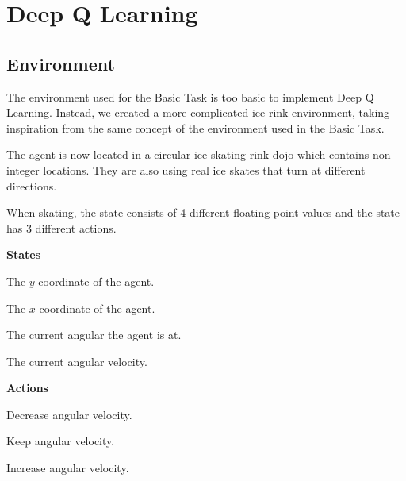 \renewcommand{\thesection}{Advanced Task}
\section{Deep Q Learning}
\subsection{Environment}
The environment used for the Basic Task is too basic to implement Deep Q Learning. Instead, we created a more complicated ice rink environment, taking inspiration from the  same concept of the environment used in the Basic Task.

The agent is now located in a circular ice skating rink dojo which contains non-integer locations.
They are also using real ice skates that turn at different directions.

When skating, the state consists of 4 different floating point values and the state has 3 different actions.

\begin{center}
	\begin{minipage}[t]{.48\textwidth}
		\begin{center}
			\textbf{States}
		\end{center}
		\begin{description}[noitemsep,style=nextline]
			\item[\bm{$y$}] The $y$ coordinate of the agent.
			\item[\bm{$x$}] The $x$ coordinate of the agent.
			\item[\bm{$\varphi$}] The current angular the agent is at.
			\item[\bm{$\theta$}] The current angular velocity.
		\end{description}
	\end{minipage}
	\begin{minipage}[t]{.48\textwidth}
		\begin{center}
			\textbf{Actions}
		\end{center}
		\begin{description}[noitemsep]
			\item[0. Turn Left] Decrease angular velocity.
			\item[1. Stay Put] Keep angular velocity.
			\item[2. Turn Right] Increase angular velocity.
		\end{description}
	\end{minipage}
\end{center}

